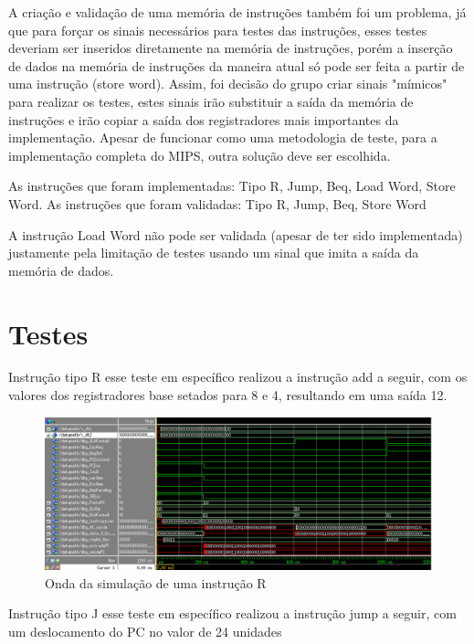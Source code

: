 \documentclass{article}
\begin{document}
    A criação e validação de uma memória de instruções também foi um problema,
    já que para forçar os sinais necessários para testes das instruções, esses
    testes deveriam ser inseridos diretamente na memória de instruções, porém a
    inserção de dados na memória de instruções da maneira atual só pode ser
    feita a partir de uma instrução (store word). Assim, foi decisão do grupo
    criar sinais "mímicos" para realizar os testes, estes sinais irão
    substituir a saída da memória de instruções e irão copiar a saída dos
    registradores mais importantes da implementação. Apesar de funcionar como
    uma metodologia de teste, para a implementação completa do MIPS, outra
    solução deve ser escolhida.

    As instruções que foram implementadas: Tipo R, Jump, Beq, Load Word, Store
    Word.  As instruções que foram validadas: Tipo R, Jump, Beq, Store Word

    A instrução Load Word não pode ser validada (apesar de ter sido
    implementada) justamente pela limitação de testes usando um sinal que imita
    a saída da memória de dados.

    \break{}

    \section{Testes}

    Instrução tipo R\: esse teste em específico realizou a instrução add a
    seguir, com os valores dos registradores base setados para 8 e 4,
    resultando em uma saída 12.

    \begin{figure}[H]
        \centering
        \includegraphics[width=\textwidth]{add_wave.jpg}
        \caption{Onda da simulação de uma instrução R}
        \label{figura:mips}
    \end{figure}

    Instrução tipo J\: esse teste em específico realizou a instrução jump a
    seguir, com um deslocamento do PC no valor de 24 unidades
\end{document}
